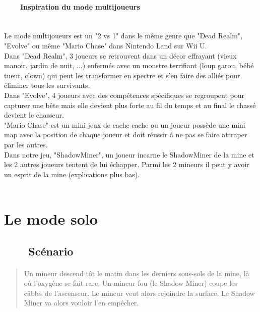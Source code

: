 \documentclass[titlepage, 13px, a4paper]{report}
\begin{document}
\paragraph{~~~~Inspiration du mode multijoueurs} \hspace{0pt} \\
Le mode multijoueurs est un "2 vs 1" dans le même genre que "Dead Realm", "Evolve" 
ou même "Mario Chase" dans Nintendo Land sur Wii U. 
\\
Dans "Dead Realm", 3 joueurs se retrouvent dans un décor effrayant (vieux manoir, jardin de nuit, ...) enfermés 
avec un monstre terrifiant (loup garou, bébé tueur, clown) qui peut les transformer 
en spectre et s'en faire des alliés pour éliminer tous les survivants. 
\\
Dans "Evolve", 4 joueurs avec des compétences spécifiques se regroupent pour capturer 
une bête mais elle devient plus forte au fil du temps et au final le chassé devient le chasseur. 
\\
"Mario Chase" est un mini jeux de cache-cache ou un joueur possède une mini map 
avec la position de chaque joueur et doit réussir à ne pas se faire attraper par les autres. 
\\
Dans notre jeu, "ShadowMiner", un joueur incarne le ShadowMiner de la mine et les 2 autres 
joueurs tentent de lui échapper. Parmi les 2 mineurs il peut y avoir un esprit de la mine (explications plus bas). \\ \\


\section{Le mode solo}

\subsection[Scénario]{~~~~Scénario}
\paragraph{} \hspace{0pt}
\begin{quotation}
	Un mineur descend tôt le matin dans les derniers sous-sols de la mine, là où l’oxygène se fait rare. 
	Un mineur fou (le Shadow Miner) coupe les câbles de l’ascenseur. 
	Le mineur veut alors rejoindre la surface. Le Shadow Miner va alors vouloir l’en empêcher. \\
\end{quotation}
\end{document}
